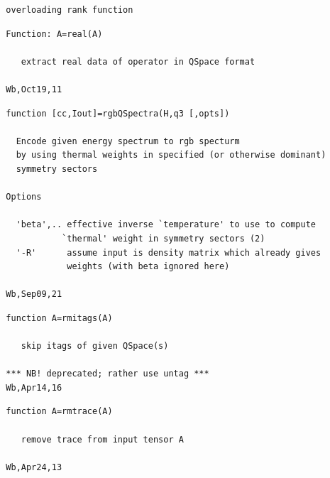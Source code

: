 \documentclass[twoside,12pt]{article}
\begin{document}
\pagebreak[3]



\begin{verbatim}
  overloading rank function
\end{verbatim}

\pagebreak[3]



\begin{verbatim}
  Function: A=real(A)
 
     extract real data of operator in QSpace format
 
  Wb,Oct19,11
\end{verbatim}

\pagebreak[3]



\begin{verbatim}
  function [cc,Iout]=rgbQSpectra(H,q3 [,opts])
 
    Encode given energy spectrum to rgb specturm
    by using thermal weights in specified (or otherwise dominant)
    symmetry sectors
 
  Options
 
    'beta',.. effective inverse `temperature' to use to compute
             `thermal' weight in symmetry sectors (2)
    '-R'      assume input is density matrix which already gives
              weights (with beta ignored here)
 
  Wb,Sep09,21
\end{verbatim}

\pagebreak[3]



\begin{verbatim}
  function A=rmitags(A)
 
     skip itags of given QSpace(s)
 
  *** NB! deprecated; rather use untag ***
  Wb,Apr14,16
\end{verbatim}

\pagebreak[3]



\begin{verbatim}
  function A=rmtrace(A)
 
     remove trace from input tensor A
 
  Wb,Apr24,13
\end{verbatim}

\pagebreak[3]
\end{document}
